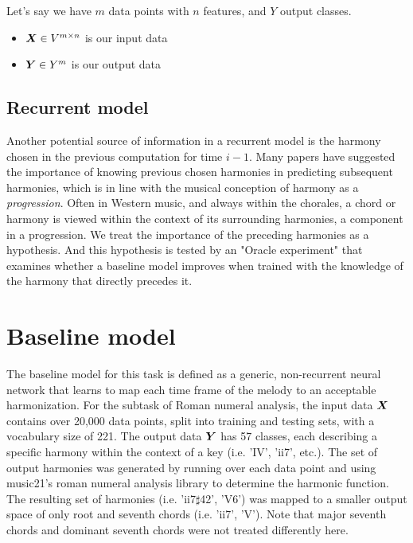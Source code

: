 \documentclass[12pt]{article}
\begin{document}
\noin Let's say we have $m$ data points with $n$ features, and $Y$ output classes.
\begin{itemize}
\item $\boldsymbol{X} \in V^{m \times n}$ is our input data
\item $\boldsymbol{Y} \in Y^m$ is our output data
\end{itemize}

\subsection{Recurrent model}

Another potential source of information in a recurrent model is the harmony chosen in the previous computation for time $i-1$. Many papers have suggested the importance of knowing previous chosen harmonies in predicting subsequent harmonies, which is in line with the musical conception of harmony as a \textit{progression}. Often in Western music, and always within the chorales, a chord or harmony is viewed within the context of its surrounding harmonies, a component in a progression. We treat the importance of the preceding harmonies as a hypothesis. And this hypothesis is tested by an "Oracle experiment" that examines whether a baseline model improves when trained with the knowledge of the harmony that directly precedes it.    


\section{Baseline model}

The baseline model for this task is defined as a generic, non-recurrent neural network that learns to map each time frame of the melody to an acceptable harmonization. For the subtask of Roman numeral analysis, the input data $\boldsymbol{X}$ contains over 20,000 data points, split into training and testing sets, with a vocabulary size of 221. The output data $\boldsymbol{Y}$ has 57 classes, each describing a specific harmony within the context of a key (i.e. 'IV', 'ii7', etc.). The set of output harmonies was generated by running over each data point and using music21's roman numeral analysis library to determine the harmonic function. The resulting set of harmonies (i.e. 'ii7$\sharp$42', 'V6') was mapped to a smaller output space of only root and seventh chords (i.e. 'ii7', 'V'). Note that major seventh chords and dominant seventh chords were not treated differently here.

\begin{center}
\end{center}
\end{document}
